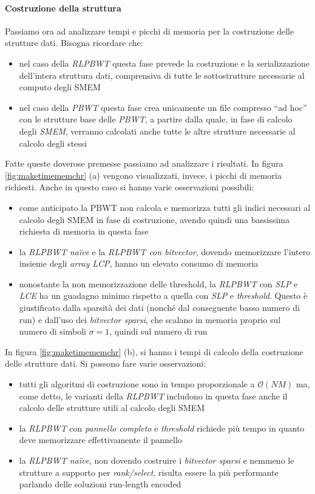 \paragraph{Costruzione della struttura}
Passiamo ora ad analizzare tempi e picchi di memoria per la costruzione delle
strutture dati. Bisogna ricordare che:
\begin{itemize}
  \item nel caso della \textit{RLPBWT} questa fase prevede la costruzione e la
  serializzazione dell'intera struttura dati, comprensiva di tutte le
  sottostrutture necessarie al computo degli SMEM
  \item nel caso della \textit{PBWT} questa fase crea unicamente un file
  compresso ``ad hoc'' con le strutture base delle \textit{PBWT}, a partire
  dalla quale, in fase di calcolo degli \textit{SMEM}, verranno calcolati anche
  tutte le altre strutture necessarie al calcolo degli stessi
\end{itemize}
Fatte queste doverose premesse passiamo ad analizzare i risultati.
In figura \ref{fig:maketimememchr} (a) vengono visualizzati, invece, i picchi di
memoria 
richiesti. Anche in questo caso si hanno varie osservazioni possibili:
\begin{itemize}
  \item come anticipato la PBWT non calcola e memorizza tutti gli indici
  necessari al calcolo degli SMEM in fase di costruzione, avendo quindi una
  bassissima richiesta di memoria in questa fase
  \item la \textit{RLPBWT na\"{i}ve} e la \textit{RLPBWT con bitvector}, dovendo
  memorizzare l'intero insieme degli \textit{array LCP}, hanno un elevato
  consumo di memoria
  \item nonostante la non memorizzazione delle threshold, la \textit{RLPBWT} con
  \textit{SLP} e \textit{LCE} ha un guadagno minimo rispetto a quella con
  \textit{SLP} e \textit{threshold}. Questo è giustificato dalla sparsità dei
  dati (nonché dal conseguente basso numero di run) e dall'uso dei
  \textit{bitvector sparsi}, che scalano in memoria proprio sul numero di
  simboli $\sigma=1$, quindi sul numero di run
\end{itemize}
In figura
\ref{fig:maketimememchr} (b), si hanno i tempi di calcolo della costruzione
delle strutture dati. Si possono fare varie osservazioni:
\begin{itemize}
  \item tutti gli algoritmi di costruzione sono in tempo proporzionale a
  $\mathcal{O}(NM)$ ma, come detto, le varianti della \textit{RLPBWT} includono
  in questa fase anche il calcolo delle strutture utili al calcolo degli SMEM
  \item la \textit{RLPBWT} con \textit{pannello completo} e \textit{threshold}
  richiede più tempo in quanto deve memorizzare effettivamente il pannello
  \item la \textit{RLPBWT na\"{i}ve}, non dovendo costruire i \textit{bitvector
    sparsi} e nemmeno le strutture a supporto per \textit{rank/select}, risulta
  essere la più performante parlando delle soluzioni run-length encoded
\end{itemize}
